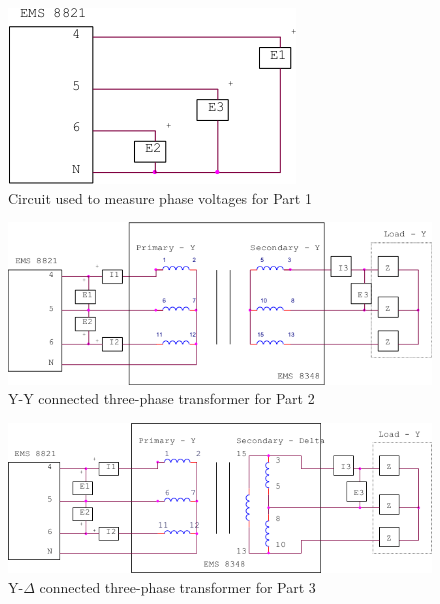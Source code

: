 \documentclass{article}
\begin{document}
\begin{figure}[H]
  \centering
  \includegraphics[width=.8\textwidth]{img/circuit_02}
  \caption{Circuit used to measure phase voltages for Part 1}
  \label{fig:circuit_02}
\end{figure}

\begin{figure}[H]
  \centering
  \includegraphics[width=.8\textwidth]{img/circuit_03}
  \caption{Y-Y connected three-phase transformer for Part 2}
  \label{fig:circuit_03}
\end{figure}

\begin{figure}[H]
  \centering
  \includegraphics[width=.8\textwidth]{img/circuit_04}
  \caption{Y-$\Delta$ connected three-phase transformer for Part 3}
  \label{fig:circuit_04}
\end{figure}
\end{document}
